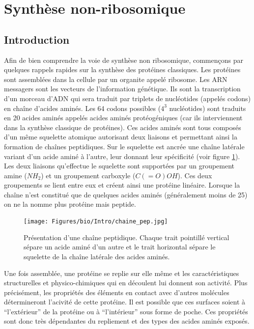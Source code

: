 \section{Synthèse non-ribosomique}
\label{bio_NRP}

\subsection{Introduction}

Afin de bien comprendre la voie de synthèse non ribosomique, commençons par quelques rappels rapides sur la synthèse des protéines classiques.
Les protéines sont assemblées dans la cellule par un organite appelé ribosome.
Les ARN messagers sont les vecteurs de l'information génétique.
Ils sont la transcription d'un morceau d'ADN qui sera traduit par triplets de nucléotides (appelés codons) en chaîne d'acides aminés.
Les 64 codons possibles ($4^3$ nucléotides) sont traduits en 20 acides aminés appelés acides aminés protéogéniques (car ils interviennent dans la synthèse classique de protéines).
Ces acides aminés sont tous composés d'un même squelette atomique autorisant deux liaisons et permettant ainsi la formation de chaînes peptidiques.
Sur le squelette est ancrée une chaîne latérale variant d'un acide aminé à l'autre, leur donnant leur spécificité (voir figure \ref{chaine_pep}).
Les deux liaisons qu'effectue le squelette sont supportées par un groupement amine ($NH_2$) et un groupement carboxyle ($C(=O)OH$).
Ces deux groupements se lient entre eux et créent ainsi une protéine linéaire.
Lorsque la chaîne n'est constitué que de quelques acides aminés (généralement moins de 25) on ne la nomme plus protéine mais peptide.

\begin{figure}[h!]
  \begin{center}
    \texttt{[image: Figures/bio/Intro/chaine\_pep.jpg]}
    \caption{\label{chaine_pep}Présentation d'une chaîne peptidique.
    Chaque trait pointillé vertical sépare un acide aminé d'un autre et le trait horizontal sépare le squelette de la chaîne latérale des acides aminés.}
  \end{center}
\end{figure}

Une fois assemblée, une protéine se replie sur elle même et les caractéristiques structurelles et physico-chimiques qui en découlent lui donnent son activité.
Plus précisément, les propriétés des éléments en contact avec d'autres molécules détermineront l'acivité de cette protéine.
Il est possible que ces surfaces soient à ``l'extérieur'' de la protéine ou à ``l'intérieur'' sous forme de poche.
Ces propriétés sont donc très dépendantes du repliement et des types des acides aminés exposés.



